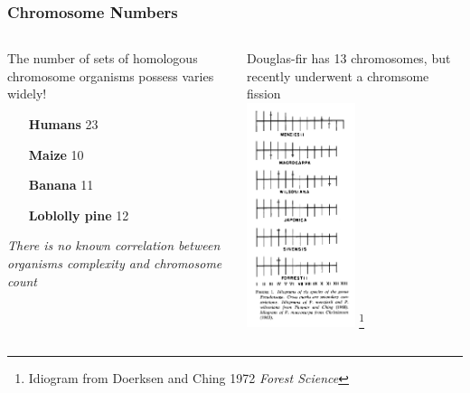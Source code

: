 \documentclass{beamer}
\newcommand\blfootnote[1]{%
	\begingroup
	\renewcommand\thefootnote{}\footnote{#1}%
	\addtocounter{footnote}{-1}%
	\endgroup
}
\begin{document}
\begin{frame}
		\frametitle{Chromosome Numbers}
		\begin{columns}
			\begin{column}{0.5\textwidth}
The number of sets of homologous chromosome organisms possess varies widely!

 \begin{itemize}[leftmargin=100pt]
	\item[\textbf{Humans}] 23 
	\item[\textbf{Maize}] 10 
	\item[\textbf{Banana}] 11
	\item[\textbf{Loblolly pine}] 12
\end{itemize}

\textit{There is no known correlation between organisms complexity and chromosome count}
			\end{column}
			\begin{column}{0.5\textwidth}
\pause
	Douglas-fir has 13 chromosomes, but recently underwent a chromsome fission\\
	\centering
		\includegraphics[keepaspectratio, width  =0.5\textwidth]{img/DouglasFirKaryotype}\blfootnote{Idiogram from Doerksen and Ching 1972 \textit{Forest Science}}
	
			\end{column}
		\end{columns}
		
		\end{frame}
	
\end{document}

